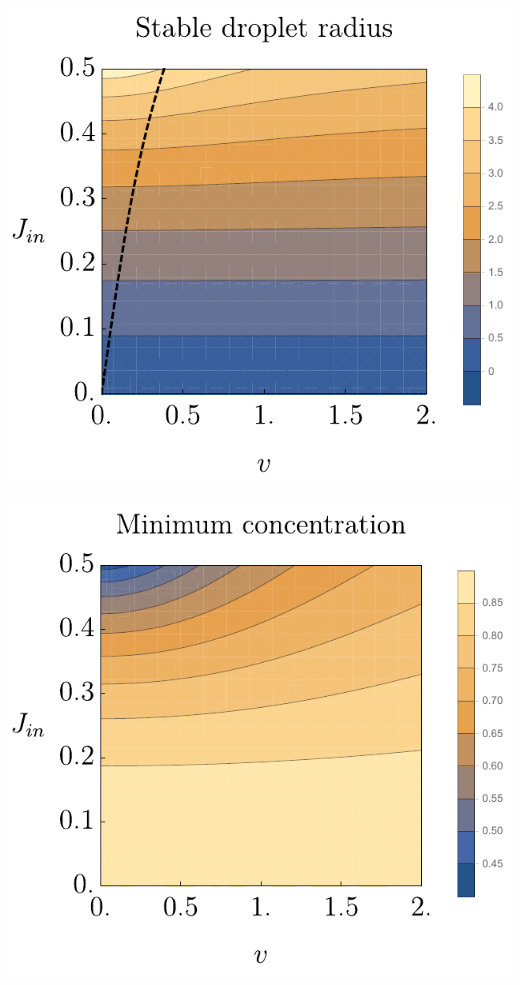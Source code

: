\documentclass{Dissertate}
\let\origfigure\figure
\let\endorigfigure\endfigure
\renewenvironment{figure}[1][2] {
    \expandafter\origfigure\expandafter[H]
} {
    \endorigfigure
}
\begin{document}
\begin{figure}
\hypertarget{fig:stableradnodecay}{%
\centering
\includegraphics{source/figures/pdf/Stable_nodecay.pdf}
\caption{The stable radius as a function of the velocity \(v\) and
influx \(J_{in}\). The dashed line is the line
\(dx_0/dt=0\).}\label{fig:stableradnodecay}
}
\end{figure}

\begin{figure}
\hypertarget{fig:minconnodecay}{%
\centering
\includegraphics{source/figures/pdf/minimumconcentration.pdf}
\caption{The minimum concentration in a stable droplet as a function of
the velocity \(v\) and influx \(J_{in}\). In areas with a low
concentration the effective droplet model is not
valid.}\label{fig:minconnodecay}
}
\end{figure}
\end{document}

